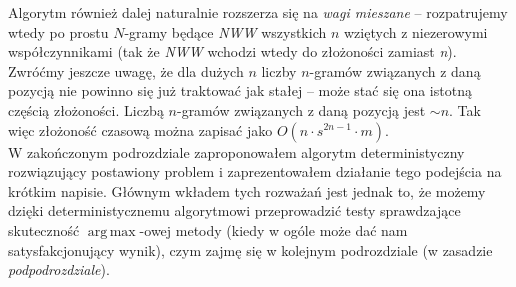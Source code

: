 \documentclass[a4paper]{article}
\DeclareMathOperator*{\argmax}{arg\,max}
\theoremstyle{defn}
\theoremstyle{theorem}
\theoremstyle{lemma}
\theoremstyle{cor}
\theoremstyle{fact}
\begin{document}
Algorytm również dalej naturalnie rozszerza się na \textit{wagi mieszane} – rozpatrujemy wtedy po prostu $N$-gramy będące \textit{NWW} wszystkich $n$ wziętych z niezerowymi współczynnikami (tak że \textit{NWW} wchodzi wtedy do złożoności zamiast \textit{n}). Zwróćmy jeszcze uwagę, że dla dużych $n$ liczby $n$-gramów związanych z daną pozycją nie powinno się już traktować jak stałej – może stać się ona istotną częścią złożoności. Liczbą $n$-gramów związanych z daną pozycją jest $\sim n$. Tak więc złożoność czasową można zapisać jako $O(n \cdot s^{2n-1} \cdot m)$.
\\

W zakończonym podrozdziale zaproponowałem algorytm deterministyczny rozwiązujący postawiony problem i zaprezentowałem działanie tego podejścia na krótkim napisie. Głównym wkładem tych rozważań jest jednak to, że możemy dzięki deterministycznemu algorytmowi przeprowadzić testy sprawdzające skuteczność $\argmax$-owej metody (kiedy w ogóle może dać nam satysfakcjonujący wynik), czym zajmę się w kolejnym podrozdziale (w zasadzie \textit{podpodrozdziale}).\\
\end{document}
